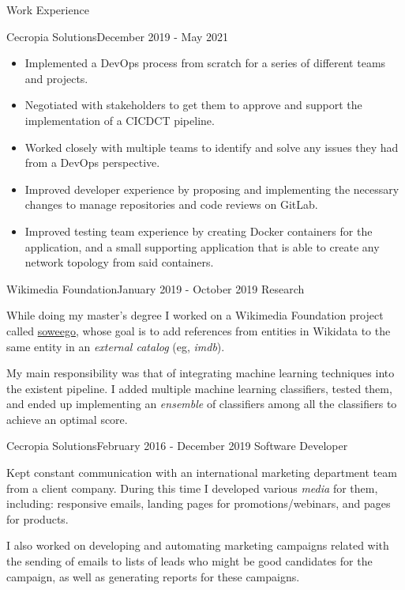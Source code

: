 \documentclass{resume} %
\begin{document}
\begin{rSection}{Work Experience}
\begin{rSubsection}{Cecropia Solutions}{December 2019 - May 2021}
\begin{itemize}
    \item Implemented a DevOps process from scratch for a series of different teams and projects. 
    \item Negotiated with stakeholders to get them to approve and support the implementation of a CICDCT pipeline.
    \item Worked closely with multiple teams to identify and solve any issues they had from a DevOps perspective.
    \item Improved developer experience by proposing and implementing the necessary changes to manage repositories and code reviews on GitLab.
    \item Improved testing team experience by creating Docker containers for the application, and a small supporting application that is able to create any network topology from said containers.
\end{itemize}


\end{rSubsection}

\begin{rSubsection}{Wikimedia Foundation}{January 2019 - October 2019}
{Research}{}
\item[] While doing my master's degree I worked on a Wikimedia Foundation project called \href{https://meta.wikimedia.org/wiki/Grants:Project/Hjfocs/soweego}{soweego}, whose goal is to add references from entities in Wikidata to the same entity in an \textit{external catalog} (eg, \textit{imdb}).

My main responsibility was that of integrating machine learning techniques into the existent pipeline. I added multiple machine learning classifiers, tested them, and ended up implementing an \textit{ensemble} of classifiers among all the classifiers to achieve an optimal score.
\end{rSubsection}

\begin{rSubsection}{Cecropia Solutions}{February 2016 - December 2019}
{Software Developer}{}
\item[] Kept constant communication with an international marketing department team from a client company. During this time I developed various \textit{media} for them, including: responsive emails, landing pages for promotions/webinars, and pages for products. 

I also worked on developing and automating marketing campaigns related with the sending of emails to lists of leads who might be good candidates for the campaign, as well as generating reports for these campaigns.


\end{rSubsection}
\end{rSection}
\end{document}
